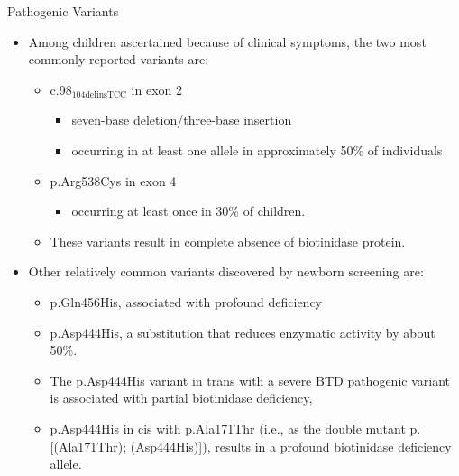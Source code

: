 \documentclass[presentation, smaller]{beamer}
\begin{document}
\begin{frame}[label={sec:orgheadline5}]{Pathogenic Variants}
\begin{itemize}
\item Among children ascertained because of clinical symptoms, the two
most commonly reported variants are:

\begin{itemize}
\item c.98\(_{\text{104delinsTCC}}\) in exon 2
\begin{itemize}
\item seven-base deletion/three-base insertion
\item occurring in at least one allele in approximately 50\% of individuals
\end{itemize}

\item p.Arg538Cys in exon 4
\begin{itemize}
\item occurring at least once in 30\% of children.
\end{itemize}

\item These variants result in complete absence of biotinidase protein.
\end{itemize}

\item Other relatively common variants discovered by newborn screening are:
\begin{itemize}
\item p.Gln456His, associated with profound deficiency

\item p.Asp444His, a substitution that reduces enzymatic activity by about 50\%.

\item The p.Asp444His variant in trans with a severe BTD pathogenic variant is associated with partial biotinidase deficiency,
\item p.Asp444His in cis with p.Ala171Thr (i.e., as the double mutant p.[(Ala171Thr); (Asp444His)]), results in a profound biotinidase deficiency allele.
\end{itemize}
\end{itemize}
\end{frame}
\end{document}
